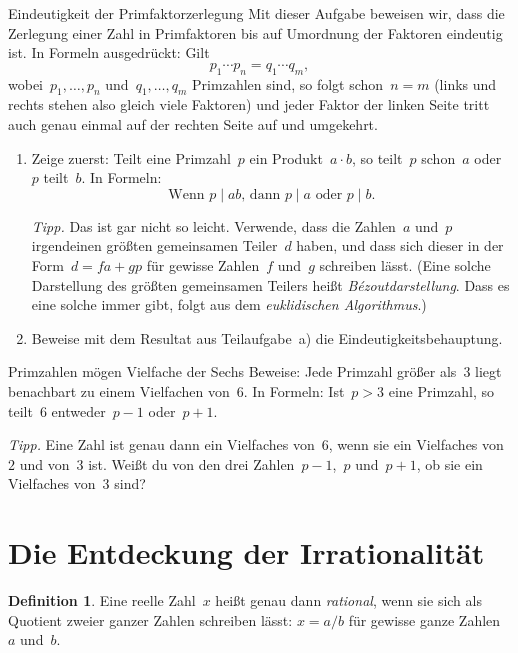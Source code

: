 \documentclass[twoside]{../zirkelblatt1415}
\theoremstyle{definition}
\newtheorem{defn}{Definition}[section]
\theoremstyle{plain}
\theoremstyle{remark}
\begin{document}
\begin{aufgabe}{Eindeutigkeit der Primfaktorzerlegung}\label{aufg:eindt}
Mit dieser Aufgabe beweisen wir, dass die Zerlegung einer Zahl in Primfaktoren
bis auf Umordnung der Faktoren eindeutig ist. In Formeln ausgedrückt: Gilt
\[ p_1 \cdots p_n = q_1 \cdots q_m, \]
wobei~$p_1,\ldots,p_n$ und~$q_1,\ldots,q_m$ Primzahlen sind, so folgt schon~$n
= m$ (links und rechts stehen also gleich viele Faktoren) und jeder Faktor der
linken Seite tritt auch genau einmal auf der rechten Seite auf und umgekehrt.

\begin{enumerate}
\item Zeige zuerst: Teilt eine Primzahl~$p$ ein Produkt~$a \cdot b$, so
teilt~$p$ schon~$a$ oder~$p$ teilt~$b$. In Formeln:
\[ \text{Wenn $p \mid ab$, dann $p \mid a$ oder $p \mid b$.} \]

\emph{Tipp.} Das ist gar nicht so leicht. Verwende, dass die Zahlen~$a$ und~$p$
irgendeinen größten gemeinsamen Teiler~$d$ haben, und dass sich dieser in der
Form~$d = fa + gp$ für gewisse Zahlen~$f$ und~$g$ schreiben lässt. (Eine solche
Darstellung des größten gemeinsamen Teilers heißt \emph{Bézoutdarstellung}.
Dass es eine solche immer gibt, folgt aus dem \emph{euklidischen Algorithmus}.)

\item Beweise mit dem Resultat aus Teilaufgabe~a) die Eindeutigkeitsbehauptung.
\end{enumerate}\fixlistspacing
\end{aufgabe}

\begin{aufgabe}{Primzahlen mögen Vielfache der Sechs}
Beweise: Jede Primzahl größer als~$3$ liegt benachbart zu einem Vielfachen
von~$6$. In Formeln: Ist~$p > 3$ eine Primzahl, so teilt~$6$ entweder~$p-1$
oder~$p+1$.

\emph{Tipp.} Eine Zahl ist genau dann ein Vielfaches von~$6$, wenn sie ein
Vielfaches von~$2$ und von~$3$ ist. Weißt du von den drei Zahlen~$p-1$,~$p$
und~$p+1$, ob sie ein Vielfaches von~$3$ sind?
\end{aufgabe}


\section{Die Entdeckung der Irrationalität}

\begin{defn}Eine reelle Zahl~$x$ heißt genau dann \emph{rational}, wenn sie
sich als Quotient zweier ganzer Zahlen schreiben lässt: $x = a/b$ für gewisse
ganze Zahlen~$a$ und~$b$.\end{defn}
\end{document}
